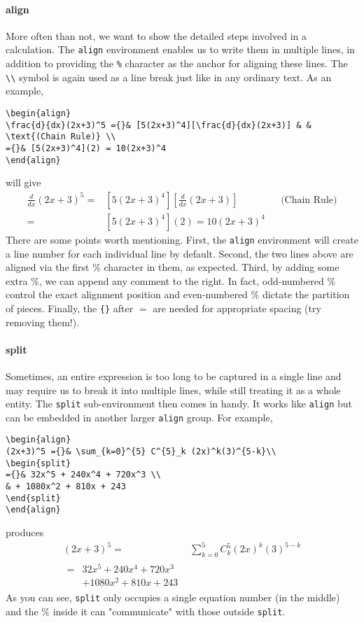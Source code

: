 \paragraph{align}
More often than not, we want to show the detailed steps involved in a calculation. The \texttt{align} environment enables us to write them in multiple lines, in addition to providing the \texttt{\%} character as the anchor for aligning these lines. The \texttt{\textbackslash\textbackslash} symbol is again used as a line break just like in any ordinary text. As an example,
\begin{lstlisting}
\begin{align}
\frac{d}{dx}(2x+3)^5 ={}& [5(2x+3)^4][\frac{d}{dx}(2x+3)] & & \text{(Chain Rule)} \\
={}& [5(2x+3)^4](2) = 10(2x+3)^4
\end{align}
\end{lstlisting}
will give
\begin{align}
\frac{d}{dx}(2x+3)^5 ={}& [5(2x+3)^4][\frac{d}{dx}(2x+3)] & & \text{(Chain Rule)} \\
={}& [5(2x+3)^4](2) = 10(2x+3)^4
\end{align}
There are some points worth mentioning. First, the \texttt{align} environment will create a line number for each individual line by default. Second, the two lines above are aligned via the first $\%$ character in them, as expected. Third, by adding some extra $\%$, we can append any comment to the right. In fact, odd-numbered $\%$ control the exact alignment position and even-numbered $\%$ dictate the partition of pieces. Finally, the \texttt{\{\}} after $=$ are needed for appropriate spacing (try removing them!).

\paragraph{split}
Sometimes, an entire expression is too long to be captured in a single line and may require us to break it into multiple lines, while still treating it as a whole entity. The \texttt{split} sub-environment then comes in handy. It works like \texttt{align} but can be embedded in another larger \texttt{align} group. For example,
\begin{lstlisting}
\begin{align}
(2x+3)^5 ={}& \sum_{k=0}^{5} C^{5}_k (2x)^k(3)^{5-k}\\
\begin{split}
={}& 32x^5 + 240x^4 + 720x^3 \\  
& + 1080x^2 + 810x + 243
\end{split}    
\end{align}
\end{lstlisting}
produces
\begin{align}
(2x+3)^5 ={}& \sum_{k=0}^{5} C^{5}_k (2x)^k(3)^{5-k}\\
\begin{split}
={}& 32x^5 + 240x^4 + 720x^3 \\  
& + 1080x^2 + 810x + 243
\end{split}    
\end{align}
As you can see, \texttt{split} only occupies a single equation number (in the middle) and the $\%$ inside it can "communicate" with those outside \texttt{split}. 
